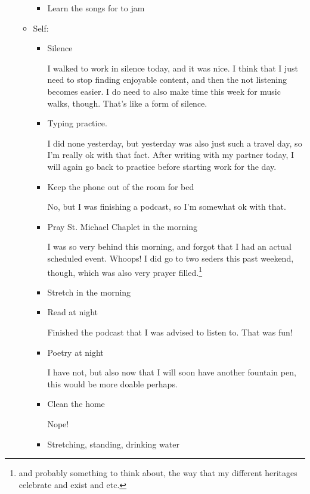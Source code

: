 \documentclass[12pt]{article}
\renewcommand{\,}{\textsuperscript{,}}
\begin{document}
\begin{itemize}
\begin{itemize}
\begin{itemize}
\item Learn the songs for to jam

\end{itemize}

\item Self:

\begin{itemize}

\item Silence

I walked to work in silence today, and it was nice.  
I think that I just need to stop finding enjoyable content, and then the not listening becomes easier.  
I do need to also make time this week for music walks, though.  
That's like a form of silence.

\item Typing practice.

I did none yesterday, but yesterday was also just such a travel day, so I'm really ok with that fact.  
After writing with my partner today, I will again go back to practice before starting work for the day.

\item Keep the phone out of the room for bed

No, but I was finishing a podcast, so I'm somewhat ok with that.

\item Pray St. Michael Chaplet in the morning

I was so very behind this morning, and forgot that I had an actual scheduled event.  
Whoops!  
I did go to two seders this past weekend, though, which was also very prayer filled.\footnote{and probably something to think about, the way that my different heritages celebrate and exist and etc.}

\item Stretch in the morning

\item Read at night

Finished the podcast that I was advised to listen to.  
That was fun!

\item Poetry at night

I have not, but also now that I will soon have another fountain pen, this would be more doable perhaps.

\item Clean the home

Nope!

\item Stretching, standing, drinking water


\end{itemize}
\end{itemize}
\end{itemize}
\end{document}
